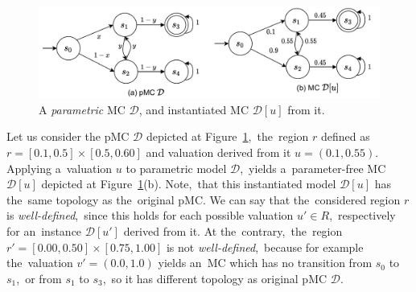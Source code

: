 \begin{figure}[h!]
\centering
\includegraphics[width=1.0\textwidth]{figures/param_instance.pdf}
\caption{A \textit{parametric} MC $\mathcal{D}$, and instantiated MC $\mathcal{D}[u]$ from it.}%
\label{fig:param_instance}%
\end{figure}

\begin{example}[Region]
Let us consider the pMC $\mathcal{D}$ depicted at Figure~\ref{fig:param_instance},~the~region $r$ defined as $r = [0.1, 0.5] \times [0.5, 0.60]$ and valuation derived from it $u = (0.1, 0.55)$.
Applying a~valuation $u$ to parametric model $\mathcal{D}$,~yields a~parameter-free MC $\mathcal{D}[u]$ depicted at Figure~\ref{fig:param_instance}(b).
Note,~that this instantiated model $\mathcal{D}[u]$ has the~same topology as the~original pMC.
We can say that the~considered region $r$ is \textit{well-defined},~since this holds for each possible valuation $u' \in R$,~respectively for an~instance $\mathcal{D}[u']$ derived from it.
At the~contrary,~the~region $r' = [0.00, 0.50] \times [0.75, 1.00]$ is not \textit{well-defined},~because for example the~valuation $v' = (0.0, 1.0)$ yields an~MC which has no transition from $s_0$ to $s_1$,~or from $s_1$ to $s_3$,~so it has different topology as original pMC $\mathcal{D}$.
\end{example}